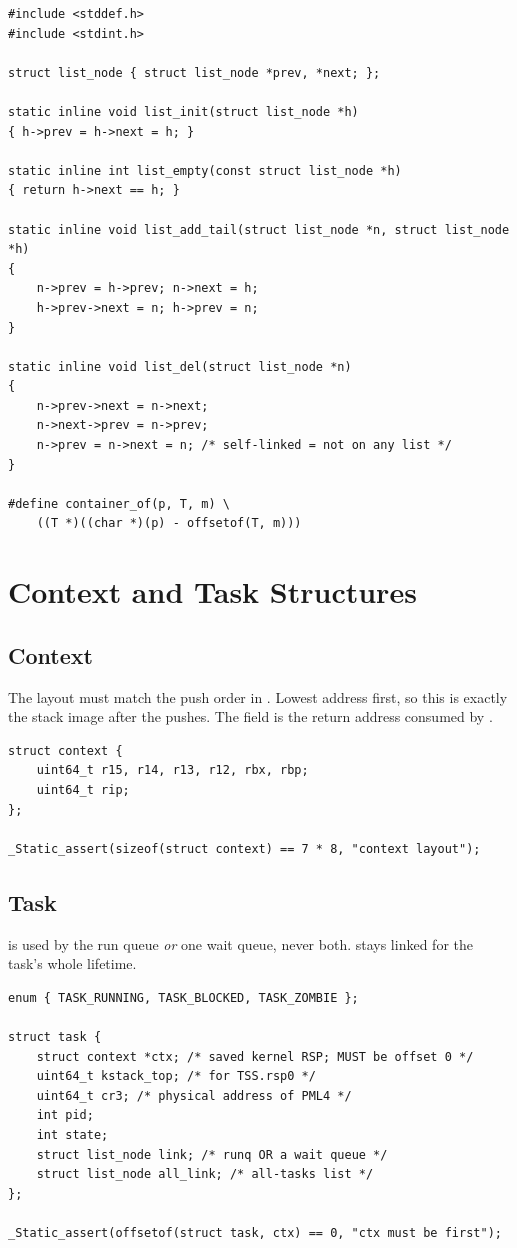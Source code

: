 \begin{lstlisting}[style=cstyle]
#include <stddef.h>
#include <stdint.h>

struct list_node { struct list_node *prev, *next; };

static inline void list_init(struct list_node *h)
{ h->prev = h->next = h; }

static inline int list_empty(const struct list_node *h)
{ return h->next == h; }

static inline void list_add_tail(struct list_node *n, struct list_node *h)
{
    n->prev = h->prev; n->next = h;
    h->prev->next = n; h->prev = n;
}

static inline void list_del(struct list_node *n)
{
    n->prev->next = n->next;
    n->next->prev = n->prev;
    n->prev = n->next = n; /* self-linked = not on any list */
}

#define container_of(p, T, m) \
    ((T *)((char *)(p) - offsetof(T, m)))
\end{lstlisting}

\section{Context and Task Structures}
\subsection{Context}
The layout must match the push order in . Lowest address
first, so this is exactly the stack image after the pushes. The 
field is the return address consumed by \code{ret}.

\begin{lstlisting}[style=cstyle]
struct context {
    uint64_t r15, r14, r13, r12, rbx, rbp;
    uint64_t rip;
};

_Static_assert(sizeof(struct context) == 7 * 8, "context layout");
\end{lstlisting}

\subsection{Task}
 is used by the run queue \emph{or} one wait queue, never both.
\code{all\_link} stays linked for the task's whole lifetime.

\begin{lstlisting}[style=cstyle]
enum { TASK_RUNNING, TASK_BLOCKED, TASK_ZOMBIE };

struct task {
    struct context *ctx; /* saved kernel RSP; MUST be offset 0 */
    uint64_t kstack_top; /* for TSS.rsp0 */
    uint64_t cr3; /* physical address of PML4 */
    int pid;
    int state;
    struct list_node link; /* runq OR a wait queue */
    struct list_node all_link; /* all-tasks list */
};

_Static_assert(offsetof(struct task, ctx) == 0, "ctx must be first");
\end{lstlisting}


